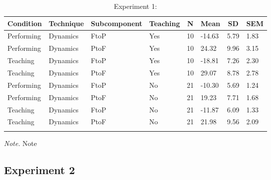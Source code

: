 \documentclass[
  man,floatsintext]{apa6}
\begin{document}
\begin{table}[tbp]

\begin{center}
\begin{threeparttable}

\caption{\label{tab:dyn-diff-teaching-desc-1}Experiment 1:}

\begin{tabular}{llllllll}
\toprule
Condition & \multicolumn{1}{c}{Technique} & \multicolumn{1}{c}{Subcomponent} & \multicolumn{1}{c}{Teaching} & \multicolumn{1}{c}{N} & \multicolumn{1}{c}{Mean} & \multicolumn{1}{c}{SD} & \multicolumn{1}{c}{SEM}\\
\midrule
Performing & Dynamics & FtoP & Yes & 10 & -14.63 & 5.79 & 1.83\\
Performing & Dynamics & PtoF & Yes & 10 & 24.32 & 9.96 & 3.15\\
Teaching & Dynamics & FtoP & Yes & 10 & -18.81 & 7.26 & 2.30\\
Teaching & Dynamics & PtoF & Yes & 10 & 29.07 & 8.78 & 2.78\\
Performing & Dynamics & FtoP & No & 21 & -10.30 & 5.69 & 1.24\\
Performing & Dynamics & PtoF & No & 21 & 19.23 & 7.71 & 1.68\\
Teaching & Dynamics & FtoP & No & 21 & -11.87 & 6.09 & 1.33\\
Teaching & Dynamics & PtoF & No & 21 & 21.98 & 9.56 & 2.09\\
\bottomrule
\addlinespace
\end{tabular}

\begin{tablenotes}[para]
\normalsize{\textit{Note.} Note}
\end{tablenotes}

\end{threeparttable}
\end{center}

\end{table}

\newpage

\hypertarget{experiment-2-5}{%
\subsection{Experiment 2}\label{experiment-2-5}}
\end{document}
